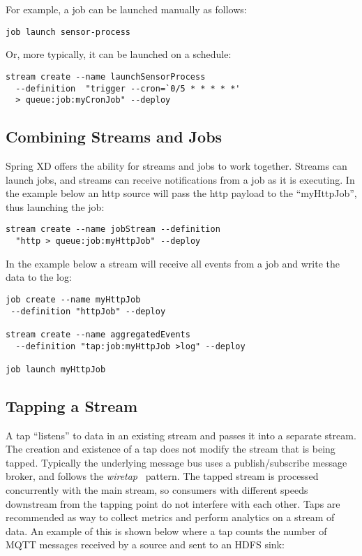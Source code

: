 For example, a job can be launched manually as follows:

\begin{lstlisting}
job launch sensor-process
\end{lstlisting}

Or, more typically, it can be launched on a schedule:

\begin{lstlisting}
stream create --name launchSensorProcess
  --definition  "trigger --cron=`0/5 * * * * *'
  > queue:job:myCronJob" --deploy
\end{lstlisting}

\subsection {Combining Streams and Jobs}

Spring XD offers the ability for streams and jobs to work together. Streams
can launch jobs, and streams can receive notifications from a job
as it is executing.  In the example below an http source will pass the http
payload to the ``myHttpJob'', thus launching the job:

\begin{lstlisting}
stream create --name jobStream --definition
  "http > queue:job:myHttpJob" --deploy
\end{lstlisting}

In the example below a stream will receive all events from a job and write
the data to the log:

\begin{lstlisting}
job create --name myHttpJob
 --definition "httpJob" --deploy

stream create --name aggregatedEvents
  --definition "tap:job:myHttpJob >log" --deploy

job launch myHttpJob
\end{lstlisting}

\subsection {Tapping a Stream} \label{sssec:deploytap}

A tap ``listens'' to data in an existing stream and passes it into a separate
stream. The creation and existence of a tap does not modify the stream that
is being tapped. Typically the underlying message bus uses a publish/subscribe
message broker, and follows the \emph{wiretap}~\cite{wiretap}
pattern. The tapped stream is processed concurrently with the main stream, so
 consumers with different speeds downstream from the tapping point do not 
 interfere with each other. Taps are recommended as way to collect metrics and perform
analytics on a stream of data. An example of this is shown below where a
tap counts the number of MQTT messages received by a source and sent to an
HDFS sink:

